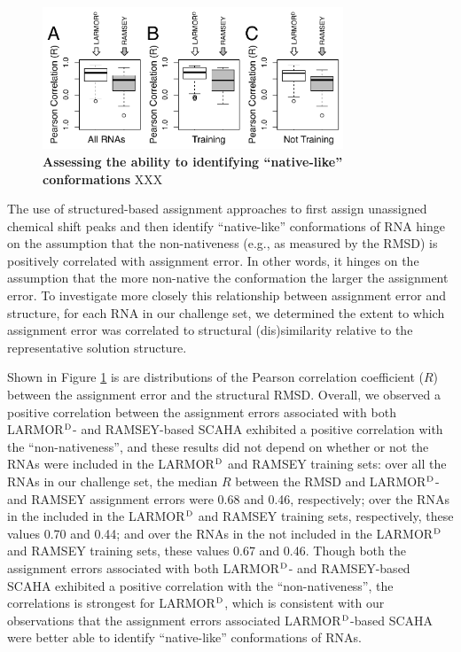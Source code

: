 \documentclass[journal=jcisd8,manuscript=article,layout=onecolumn]{achemso}
\begin{document}
\begin{figure}[h!]
  \centering
       \includegraphics[width=0.8\textwidth]{figure_3}
  \caption{\textbf{Assessing the ability to identifying ``native-like'' conformations} XXX}
  \label{fig:correlations}
\end{figure}

The use of structured-based assignment approaches to first assign unassigned chemical shift peaks and then identify ``native-like'' conformations of RNA hinge on the assumption that the non-nativeness (e.g., as measured by the RMSD) is positively correlated with assignment error. In other words, it hinges on the assumption that the more non-native the conformation the larger the assignment error. To investigate more closely this relationship between assignment error and structure, for each RNA in our challenge set, we determined the extent to which assignment error was correlated to structural (dis)similarity relative to the representative solution structure. 

Shown in Figure \ref{fig:correlations} is are distributions of the Pearson correlation coefficient ($R$) between the assignment error and the structural RMSD. Overall, we observed a positive correlation between the assignment errors associated with both LARMOR$^{\rm D}$- and RAMSEY-based SCAHA exhibited a positive correlation with the ``non-nativeness'', and these results did not depend on whether or not the RNAs were included in the LARMOR$^{\rm D}$ and RAMSEY training sets: over all the RNAs in our challenge set, the median $R$ between the RMSD and LARMOR$^{\rm D}$- and RAMSEY assignment errors were 0.68  and 0.46, respectively;  over the RNAs in the included in the LARMOR$^{\rm D}$ and RAMSEY training sets, respectively, these values 0.70 and  0.44; and over the RNAs in the not included in the LARMOR$^{\rm D}$ and RAMSEY training sets, these values 0.67 and 0.46. Though both the assignment errors associated with both LARMOR$^{\rm D}$- and RAMSEY-based SCAHA exhibited a positive correlation with the ``non-nativeness'', the correlations is strongest for LARMOR$^{\rm D}$, which is consistent with our observations that the assignment errors associated LARMOR$^{\rm D}$-based SCAHA were better able to identify ``native-like'' conformations of RNAs.
\end{document}
